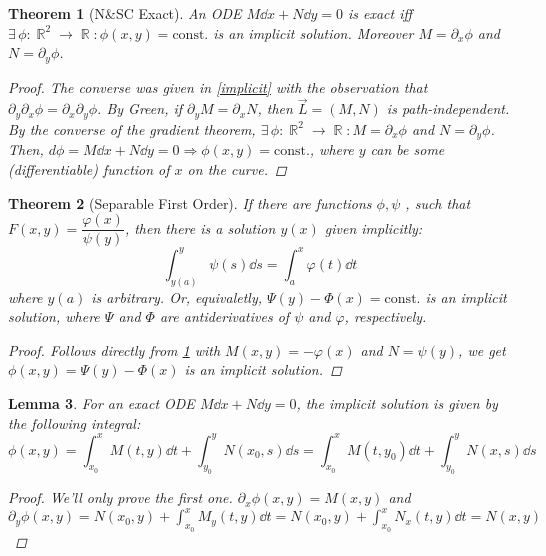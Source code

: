 \documentclass[12pt]{article}
\let\RA\Rightarrow
\newcommand{\Exist}[1]{\exists\,{#1}:}
\DeclareMathOperator{\R}{\mathbb{R}}
\newcommand*{\pdx}{\partial_x}
\newcommand*{\pdy}{\partial_y}
\newtheorem{theorem}{Theorem}[subsection]
\newtheorem{lemma}[theorem]{Lemma}
\begin{document}
\begin{theorem}[N\&SC Exact]
  An ODE $M\dd{x}+N\dd{y}=0$ is exact iff $\Exist{\phi:\R^2\to\R}\phi(x,y)=\text{const.}$ is an implicit solution. Moreover $M=\pdx\phi$ and $N=\pdy\phi$.
  \label{NSC exact}
  \begin{proof}
    The converse was given in \ref{implicit} with the observation that $\pdy\pdx\phi= \pdx\pdy\phi$. By Green, if $\pdy M=\pdx N$, then $\vec{L}=(M,N)$ is path-independent. By the converse of the gradient theorem, $\Exist{\phi:\R^2\to\R}M=\pdx\phi$ and $N=\pdy\phi$. Then, $d\phi=M\dd{x}+N\dd{y}=0\RA \phi(x,y)=\text{const.}$, where $y$ can be some (differentiable) function of $x$ on the curve.
  \end{proof}
\end{theorem}

\begin{theorem}[Separable First Order]
  \label{separation}
  If there are functions $\phi,\psi$ , such that $F(x,y)=\dfrac{\varphi(x)}{\psi(y)}$, then there is a solution $y(x)$ given implicitly: $$\int_{y(a)}^{y}\psi(s)\dd{s}=\int_a^x\varphi(t)\dd{t}$$ where $y(a)$ is arbitrary. Or, equivaletly, $\Psi(y)-\Phi(x)=\text{const.}$ is an implicit solution, where $\Psi$ and $\Phi$ are antiderivatives of $\psi$ and $\varphi$, respectively.
  \begin{proof}
    Follows directly from \ref{NSC exact} with $M(x,y)=-\varphi(x)$ and $N=\psi(y)$, we get $\phi(x,y)=\Psi(y)-\Phi(x)$ is an implicit solution.
  \end{proof}
\end{theorem}

\begin{lemma}
  For an exact ODE $M\dd{x}+N\dd{y}=0$, the implicit solution is given by the following integral: $$\phi(x,y)=\int_{x_0}^x M(t,y)\dd{t}+\int_{y_0}^y N(x_0,s)\dd{s}=\int_{x_0}^x M(t,y_0)\dd{t}+\int_{y_0}^y N(x,s)\dd{s}$$
  \begin{proof}
    We'll only prove the first one. $\pdx\phi(x,y)=M(x,y)$ and $\displaystyle\pdy\phi(x,y)=N(x_0,y)+\int_{x_0}^x M_y(t,y)\dd{t}=N(x_0,y)+\int_{x_0}^x N_x(t,y)\dd{t}=N(x,y)$
  \end{proof}
\end{lemma}
\end{document}
